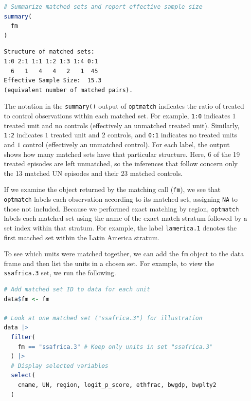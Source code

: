\documentclass[twoside,11pt]{article}
\begin{document}
\begin{lstlisting}[language=R]
# Summarize matched sets and report effective sample size
summary(
  fm
)
\end{lstlisting}

\begin{verbatim}
Structure of matched sets:
1:0 2:1 1:1 1:2 1:3 1:4 0:1
  6   1   4   4   2   1  45
Effective Sample Size:  15.3
(equivalent number of matched pairs).
\end{verbatim}



The notation in the \texttt{summary()} output of \texttt{optmatch}
indicates the ratio of treated to control observations within each
matched set. For example, \texttt{1:0} indicates \(1\) treated unit and
no controls (effectively an unmatched treated unit). Similarly,
\texttt{1:2} indicates \(1\) treated unit and \(2\) controls, and
\texttt{0:1} indicates no treated units and \(1\) control (effectively
an unmatched control). For each label, the output shows how many
matched sets have that particular structure. Here, 6 of the 19 treated episodes are left unmatched, so the inferences that follow concern only the 13 matched UN episodes and their 23 matched controls.

If we examine the object returned by the matching call (\texttt{fm}), we
see that \texttt{optmatch} labels each observation according to its
matched set, assigning \texttt{NA} to those not included. Because we
performed exact matching by region, \texttt{optmatch} labels each
matched set using the name of the exact-match stratum followed by a set
index within that stratum. For example, the label \texttt{lamerica.1}
denotes the first matched set within the Latin America stratum.

To see which units were matched together, we can add the \texttt{fm}
object to the data frame and then list the units in a chosen set. For example, to view the
\texttt{ssafrica.3} set, we run the following.



\begin{lstlisting}[language=R]
# Add matched set ID to data for each unit
data$fm <- fm

# Look at one matched set ("ssafrica.3") for illustration
data |>
  filter(
    fm == "ssafrica.3" # Keep only units in set "ssafrica.3"
  ) |>
  # Display selected variables
  select(
    cname, UN, region, logit_p_score, ethfrac, bwgdp, bwplty2
  )
\end{lstlisting}
\end{document}
